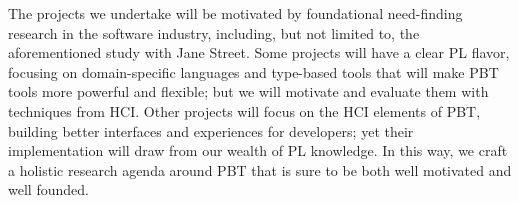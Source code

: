\iflater{}\fi
The projects we undertake will be motivated by
foundational need-finding research in the software industry, including, but not
limited to, the aforementioned study with Jane Street. Some projects will have a
clear PL flavor, focusing on domain-specific languages and type-based tools that
will make PBT tools more powerful and flexible; but we will motivate and
evaluate them with techniques from HCI. Other projects will focus on the HCI elements
of PBT, building better interfaces and experiences for developers; yet their
implementation will draw from our wealth of PL knowledge. In this way, we craft
a holistic research agenda around PBT that is sure to be both well motivated and
well founded.




